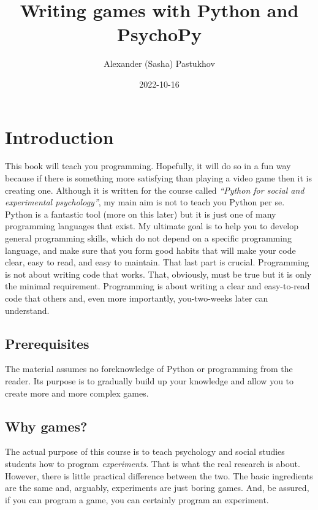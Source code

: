 \documentclass[
]{book}
\title{Writing games with Python and PsychoPy}
\author{Alexander (Sasha) Pastukhov}
\date{2022-10-16}
\begin{document}
\maketitle

{
\setcounter{tocdepth}{1}
\tableofcontents
}
\hypertarget{intro}{%
\chapter{Introduction}\label{intro}}

This book will teach you programming. Hopefully, it will do so in a fun way because if there is something more satisfying than playing a video game then it is creating one. Although it is written for the course called \emph{``Python for social and experimental psychology''}, my main aim is not to teach you Python per se. Python is a fantastic tool (more on this later) but it is just one of many programming languages that exist. My ultimate goal is to help you to develop general programming skills, which do not depend on a specific programming language, and make sure that you form good habits that will make your code clear, easy to read, and easy to maintain. That last part is crucial. Programming is not about writing code that works. That, obviously, must be true but it is only the minimal requirement. Programming is about writing a clear and easy-to-read code that others and, even more importantly, you-two-weeks later can understand.

\hypertarget{prerequisites}{%
\section{Prerequisites}\label{prerequisites}}

The material assumes no foreknowledge of Python or programming from the reader. Its purpose is to gradually build up your knowledge and allow you to create more and more complex games.

\hypertarget{why-games}{%
\section{Why games?}\label{why-games}}

The actual purpose of this course is to teach psychology and social studies students how to program \emph{experiments}. That is what the real research is about. However, there is little practical difference between the two. The basic ingredients are the same and, arguably, experiments are just boring games. And, be assured, if you can program a game, you can certainly program an experiment.
\end{document}
